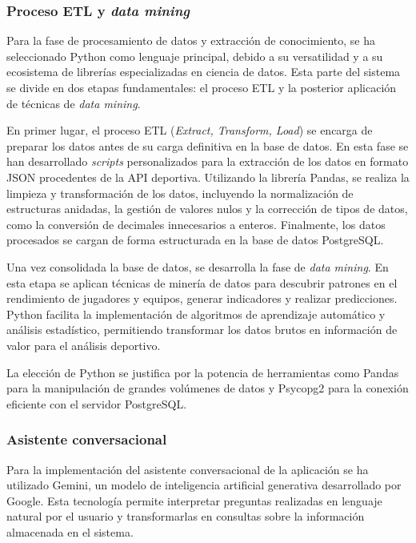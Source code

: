 \subsubsection{Proceso ETL y \textit{data mining}}

Para la fase de procesamiento de datos y extracción de conocimiento, se ha seleccionado Python como lenguaje principal, debido a su versatilidad y a su ecosistema de librerías especializadas en ciencia de datos. Esta parte del sistema se divide en dos etapas fundamentales: el proceso ETL y la posterior aplicación de técnicas de \textit{data mining}.

En primer lugar, el proceso ETL (\textit{Extract, Transform, Load}) se encarga de preparar los datos antes de su carga definitiva en la base de datos. En esta fase se han desarrollado \textit{scripts} personalizados para la extracción de los datos en formato JSON procedentes de la API deportiva. Utilizando la librería Pandas, se realiza la limpieza y transformación de los datos, incluyendo la normalización de estructuras anidadas, la gestión de valores nulos y la corrección de tipos de datos, como la conversión de decimales innecesarios a enteros. Finalmente, los datos procesados se cargan de forma estructurada en la base de datos PostgreSQL.

Una vez consolidada la base de datos, se desarrolla la fase de \textit{data mining}. En esta etapa se aplican técnicas de minería de datos para descubrir patrones en el rendimiento de jugadores y equipos, generar indicadores y realizar predicciones. Python facilita la implementación de algoritmos de aprendizaje automático y análisis estadístico, permitiendo transformar los datos brutos en información de valor para el análisis deportivo.

La elección de Python se justifica por la potencia de herramientas como Pandas para la manipulación de grandes volúmenes de datos y Psycopg2 para la conexión eficiente con el servidor PostgreSQL.

\subsubsection{Asistente conversacional}

Para la implementación del asistente conversacional de la aplicación se ha utilizado Gemini, un modelo de inteligencia artificial generativa desarrollado por Google. Esta tecnología permite interpretar preguntas realizadas en lenguaje natural por el usuario y transformarlas en consultas sobre la información almacenada en el sistema.

